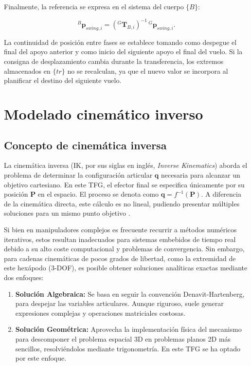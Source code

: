 Finalmente, la referencia se expresa en el sistema del cuerpo $\{B\}$:

\vspace{-0.5\baselineskip}
\begin{equation}
    {}^{B}\bm{p}_{swing,i}
    = \left({}^{G}\mathbf{T}_{B,i}\right)^{-1}\,{}^{G}\bm{p}_{swing,i}.
    \label{eq:swing_body_transform}
\end{equation}
\vspace{-1\baselineskip}

La continuidad de posición entre fases se establece tomando como despegue el final del apoyo anterior y como inicio del siguiente apoyo el final del vuelo. Si la consigna de desplazamiento cambia durante la transferencia, los extremos almacenados en $\{tr\}$ no se recalculan, ya que el nuevo valor se incorpora al planificar el destino del siguiente vuelo. 



\section{Modelado cinemático inverso}

\subsection{Concepto de cinemática inversa}

La cinemática inversa (IK, por sus siglas en inglés, \textit{Inverse Kinematics}) aborda el problema de determinar la configuración articular $\bm{q}$ necesaria para alcanzar un objetivo cartesiano. En este TFG, el efector final se especifica únicamente por su posición $\bm{P}$ en el espacio. El proceso se denota como $\bm{q} = f^{-1}(\bm{P})$. A diferencia de la cinemática directa, este cálculo es no lineal, pudiendo presentar múltiples soluciones para un mismo punto objetivo \cite{craig2018robotics,siciliano2016springer}.

Si bien en manipuladores complejos es frecuente recurrir a métodos numéricos iterativos, estos resultan inadecuados para sistemas embebidos de tiempo real debido a su alto coste computacional y problemas de convergencia. Sin embargo, para cadenas cinemáticas de pocos grados de libertad, como la extremidad de este hexápodo (3-DOF), es posible obtener soluciones analíticas exactas mediante dos enfoques:

\begin{enumerate}
    \item \textbf{Solución Algebraica:} Se basa en seguir la convención Denavit-Hartenberg, para despejar las variables articulares. Aunque riguroso, suele generar expresiones complejas y operaciones matriciales costosas.
    
    \item \textbf{Solución Geométrica:} Aprovecha la implementación física del mecanismo para descomponer el problema espacial 3D en problemas planos 2D más sencillos, resolviéndolos mediante trigonometría. En este TFG se ha optado por este enfoque.
\end{enumerate}



